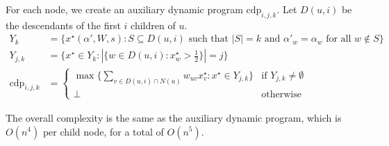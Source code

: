 For each node, we create an auxiliary dynamic program $\mathrm{cdp}_{i,j,k}$. Let
$D(u, i)$ be the descendants of the first $i$ children of $u$.
\begin{align*}
    Y_k &= \{ x^\star(\alpha', W, s) : S \subseteq D(u, i) \textrm{ such that } |S| = k
        \textrm{ and } \alpha'_w = \alpha_w \textrm{ for all } w \notin S \} \\
    Y_{j, k} &= \{ x^\star \in Y_k : |\{ w \in D(u, i) :
        x_w^\star > {\textstyle \frac 1 2} \}| = j \} \\
    \mathrm{cdp}_{i, j, k} &= \left\{ \begin{array}{ll}
        \max \{ \sum_{v \in D(u, i) \cap N(u)} w_{uv} x^\star_v : x^\star \in Y_{j, k} \} & \textrm{if } Y_{j, k} \not= \emptyset \\
        \bot & \textrm{otherwise}
    \end{array} \right.
\end{align*}

The overall complexity is the same as the auxiliary dynamic program, which is $O(n^4)$ per child node, for a total of $O(n^5)$.


